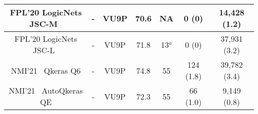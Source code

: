 \begin{table}[t]
{\begin{threeparttable}
\begin{tabular}{c| c | c |c |c | c |c }
FPL'20 LogicNets JSC-M~\cite{umuroglu2020logicnets} 
& - & VU9P & 70.6 & NA & 0 (0) 
& 14,428 (1.2)
\\
\midrule
FPL'20 LogicNets JSC-L~\cite{umuroglu2020logicnets} 
& - & VU9P & 71.8 & 13$^a$ & 0 (0) 
& 37,931 (3.2)
\\
\midrule

NMI'21~\cite{coelho2021automatic} Qkeras Q6
& - & VU9P & 74.8 & 55 
& 124 (1.8)
& 39,782 (3.4)
\\
\midrule

NMI'21~\cite{coelho2021automatic} AutoQkeras QE
& - & VU9P & 72.3 & 55
& 66 (1.0)
& 9,149 (0.8)
\\
\midrule


\end{tabular}
\end{threeparttable}}
\end{table}
